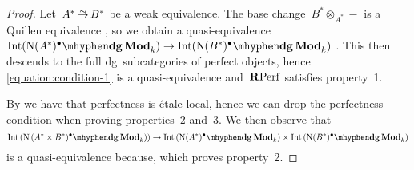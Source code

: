 \begin{refsection}
\begin{theorem}
\begin{proof}[Proof]
    
    Let~$A^*\weq B^*$ be a weak equivalence. The base change~$B^*\otimes_{A^*}-$ is a Quillen equivalence \addreference, so we obtain a quasi-equivalence~$\Int(\dgMod{\nerve(A^*)^\bullet}_k)\to\Int(\dgMod{\nerve(B^*)^\bullet}_k)$ \addreference. This then descends to the full dg~subcategories of perfect objects, hence \eqref{equation:condition-1} is a quasi-equivalence and~$\mathbf{R}\mathrm{Perf}$ satisfies property~1.

    By \cite[corollary 1.3.7.4]{hagII} we have that perfectness is \'etale local, hence we can drop the perfectness condition when proving properties~2 and~3. We then observe that
    \begin{equation}
      \Int\left( \dgMod{\nerve\left( A^*\times B^*)^\bullet}_k \right) \right)\to\Int\left( \dgMod{\nerve(A^*)^\bullet}_k \right)\times\Int\left( \dgMod{\nerve(B^*)^\bullet}_k \right)
    \end{equation}
    is a quasi-equivalence because\expandthis, which proves property~2.


\end{proof}
\end{theorem}
\end{refsection}
